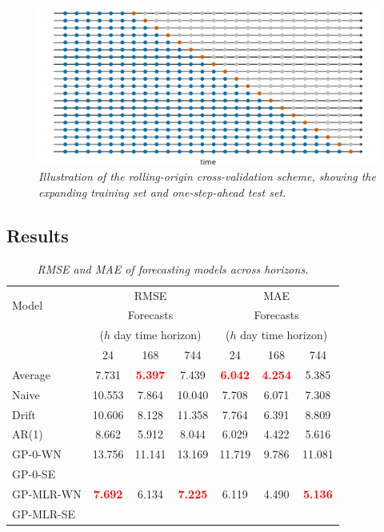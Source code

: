       \begin{figure}[H]
            \centering
            \includegraphics[width=0.48\linewidth]{../images/cross_validation.png}
            \caption{\textit{Illustration of the rolling-origin cross-validation scheme, showing the expanding training set and one-step-ahead test set. \cite{fpp3_CV}}}
      \end{figure}
   
   \subsection{Results}

      \begin{table}[H]
         \centering
         \begin{tabular}{lcccccc}
         \hline
         \multirow{2}{*}{Model} & \multicolumn{3}{c}{RMSE} & \multicolumn{3}{c}{MAE} \\
         \cline{2-7}
         & \multicolumn{3}{c}{Forecasts} & \multicolumn{3}{c}{Forecasts} \\
         & \multicolumn{3}{c}{($h$ day time horizon)} & \multicolumn{3}{c}{($h$ day time horizon)} \\
         & 24 & 168 & 744 & 24 & 168 & 744 \\
         \hline
         Average & {7.731} & \textbf{\textcolor{red}{5.397}} & {7.439} & \textbf{\textcolor{red}{6.042}} & \textbf{\textcolor{red}{4.254}} & {5.385} \\
         Naive & {10.553} & {7.864} & {10.040} & {7.708} & {6.071} & {7.308} \\
         Drift & {10.606} & {8.128} & {11.358} & {7.764} & {6.391} & {8.809} \\
         AR(1) & {8.662} & {5.912} & {8.044} & {6.029} & {4.422} & {5.616} \\
         GP-0-WN & {13.756} & {11.141} & {13.169} & {11.719} & {9.786} & {11.081} \\
         GP-0-SE & {~} & {~} & {~} & {~} & {~} & {~} \\
         GP-MLR-WN & \textbf{\textcolor{red}{7.692}} & {6.134} & \textbf{\textcolor{red}{7.225}} & {6.119} & {4.490} & \textbf{\textcolor{red}{5.136}} \\
         GP-MLR-SE & {~} & {~} & {~} & {~} & {~} & {~} \\
         \hline
         \end{tabular}
         \caption{\textit{RMSE and MAE of forecasting models across horizons.}}
      \end{table}

